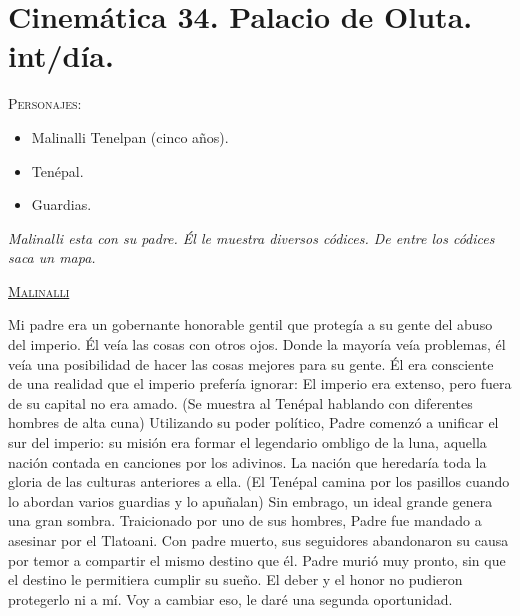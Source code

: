 \documentclass[11pt,letterpaper]{article}
\begin{document}
\section{Cinemática 34. Palacio de Oluta. int/día. }
 \textsc{Personajes}:
 \begin{itemize}
 \item Malinalli Tenelpan (cinco años).
\item Tenépal.
\item Guardias.
 \end{itemize}
\textit{Malinalli esta con su padre. Él le muestra diversos códices. De entre los códices saca un mapa.}
\begin{center}
\textsc{\underline{Malinalli}}
\\
\par
Mi padre era un gobernante honorable gentil que protegía a su gente del abuso del imperio. Él veía las cosas con otros ojos. Donde la mayoría veía problemas, él veía una posibilidad de hacer las cosas mejores para su gente. Él era consciente de una realidad que el imperio prefería ignorar: El imperio era extenso, pero fuera de su capital no era amado. (Se muestra al Tenépal hablando con diferentes hombres de alta cuna) Utilizando su poder político, Padre comenzó a unificar el sur del imperio: su misión era formar el legendario ombligo de la luna, aquella nación contada en canciones por los adivinos. La nación que heredaría toda la gloria de las culturas anteriores a ella. (El Tenépal camina por los pasillos cuando lo abordan varios guardias y lo apuñalan) Sin embrago, un ideal grande genera una gran sombra. Traicionado por uno de sus hombres, Padre fue mandado a asesinar por el Tlatoani. Con padre muerto, sus seguidores abandonaron su causa por temor a compartir el mismo destino que él. Padre murió muy pronto, sin que el destino le permitiera cumplir su sueño. El deber y el honor no pudieron protegerlo ni a mí. Voy a cambiar eso, le daré una segunda oportunidad.
\end{center}
\end{document}
